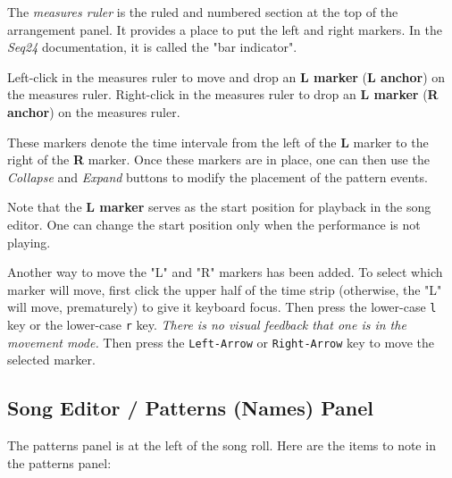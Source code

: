    The \textsl{measures ruler} is the ruled and numbered section at the top
   of the arrangement panel.  It provides a place to put the left and right
   markers.  In the \textsl{Seq24} documentation, it is called the "bar
   indicator".

   Left-click in the measures ruler to move and drop an
   \textbf{L marker} (\textbf{L anchor}) on the measures ruler.
   Right-click in the measures ruler to drop an
   \textbf{L marker} (\textbf{R anchor}) on the measures ruler.
   
   These markers denote the time intervale from the left of the 
   \textbf{L} marker to the right of the \textbf{R} marker.
   Once these markers are in place, one can then use
	the \textsl{Collapse} and \textsl{Expand} buttons to modify the
   placement of the pattern events.

   Note that the \textbf{L marker} serves as the start position for playback
   in the song editor.  One can change the start position only when the
   performance is not playing.

   Another way to move the "L" and "R" markers has been added.
   To select which marker will move, first click the upper half of the time
   strip (otherwise, the "L" will move, prematurely) to give it keyboard focus.
   Then press the lower-case
   \texttt{l} key or the lower-case
   \texttt{r} key.
   \textsl{There is no visual feedback that one is in the movement mode.}
   Then press the \texttt{Left-Arrow} or \texttt{Right-Arrow}
   key to move the selected marker.

\subsection{Song Editor / Patterns (Names) Panel}
\label{subsec:song_editor_patterns_panel}

   The patterns panel is at the left of the song roll.
   Here are the items to note in the patterns panel:

